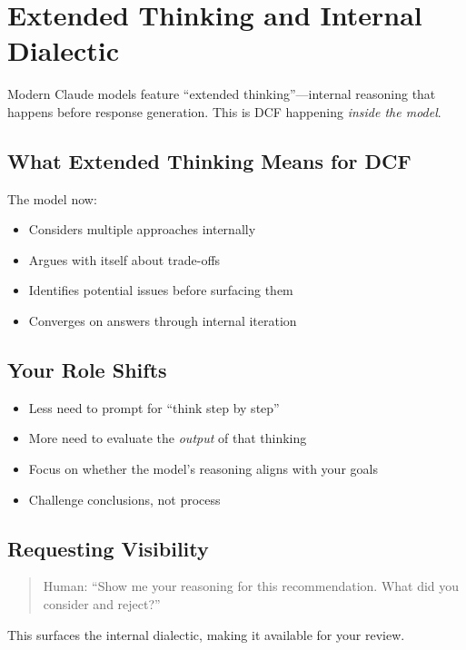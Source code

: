 \chapter{Extended Thinking and Internal Dialectic}

Modern Claude models feature ``extended thinking''---internal reasoning that happens before response generation. This is DCF happening \emph{inside the model}.

\section{What Extended Thinking Means for DCF}

The model now:
\begin{itemize}
    \item Considers multiple approaches internally
    \item Argues with itself about trade-offs
    \item Identifies potential issues before surfacing them
    \item Converges on answers through internal iteration
\end{itemize}

\section{Your Role Shifts}

\begin{itemize}
    \item Less need to prompt for ``think step by step''
    \item More need to evaluate the \emph{output} of that thinking
    \item Focus on whether the model's reasoning aligns with your goals
    \item Challenge conclusions, not process
\end{itemize}

\section{Requesting Visibility}

\begin{quote}
Human: ``Show me your reasoning for this recommendation. What did you consider and reject?''
\end{quote}

This surfaces the internal dialectic, making it available for your review.

